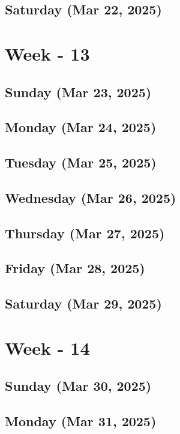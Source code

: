 \subsection*{Saturday (Mar 22, 2025)}

\section{Week - 13}
\subsection*{Sunday (Mar 23, 2025)}
\subsection*{Monday (Mar 24, 2025)}
\subsection*{Tuesday (Mar 25, 2025)}
\subsection*{Wednesday (Mar 26, 2025)}
\subsection*{Thursday (Mar 27, 2025)}
\subsection*{Friday (Mar 28, 2025)}
\subsection*{Saturday (Mar 29, 2025)}

\section{Week - 14}
\subsection*{Sunday (Mar 30, 2025)}
\subsection*{Monday (Mar 31, 2025)}

\newpage
\begin{spacing}{1.0}
\renewcommand{\bibname}{\bf{References}}


\end{spacing}